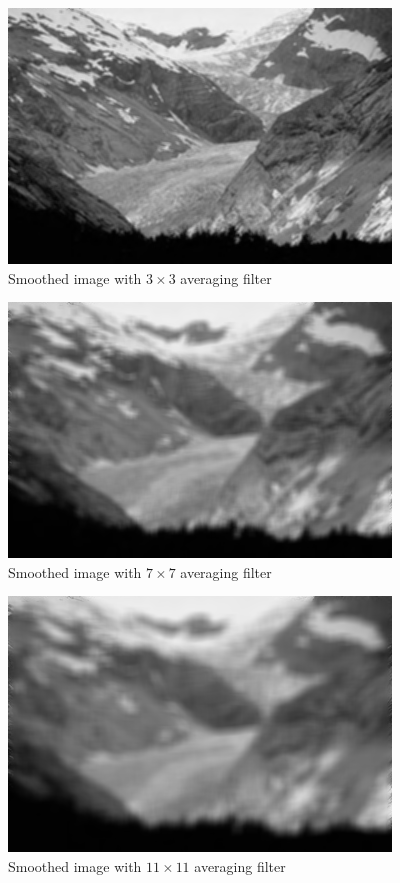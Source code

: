 \documentclass{article}
\begin{document}
\begin{figure}[H]
	\centering
	\includegraphics[width=288pt]{../result/filter-smooth-3-3.png}
	\caption{Smoothed image with $3 \times 3$ averaging filter}
\end{figure}

\begin{figure}[H]
	\centering
	\includegraphics[width=288pt]{../result/filter-smooth-7-7.png}
	\caption{Smoothed image with $7 \times 7$ averaging filter}
\end{figure}

\begin{figure}[H]
	\centering
	\includegraphics[width=288pt]{../result/filter-smooth-11-11.png}
	\caption{Smoothed image with $11 \times 11$ averaging filter}
\end{figure}
\end{document}
